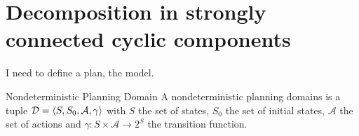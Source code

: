 %


\section{Decomposition in strongly connected cyclic components}

\newcommand{\planningdomain}{\ensuremath{ \tuple{\langle S, S_0, \mathcal{A}, \gamma \rangle} }}

\newcommand{\controller}{\ensuremath{\tuple{ \langle C, c_0, \Gamma, \Lambda, \delta, \Omega \rangle}}}

\newcommand{\planningproblem}{\ensuremath{\tuple{ \langle \mathcal{D}, G \rangle}}}
I need to define a plan, the model.

\begin{nameddef}{Nondeterministic Planning Domain}
A nondeterministic planning domains is a tuple 
$\mathcal{D} = \planningdomain$
with
$S$ the set of states,
$S_0$ the set of initial states,
$\mathcal{A}$ the set of actions and
$\gamma : S \times \mathcal{A} \rightarrow 2^S$ the transition function.
\end{nameddef}

